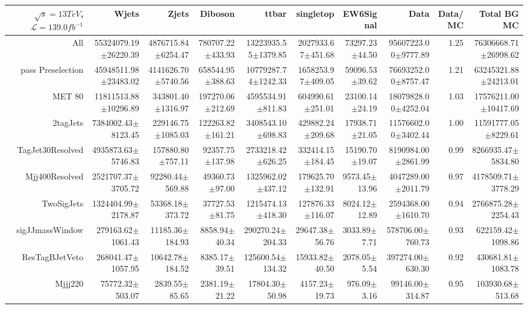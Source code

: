  \begin{tabular}{ r ||  r  r  r  r  r  r || r r r |} 
 \ensuremath{\sqrt{s}=13 TeV}, \ensuremath{\mathcal{L}=139.0 fb^{-1}}  & Wjets & Zjets & Diboson & ttbar & singletop & EW6Signal& Data & Data/MC & Total BG MC \tabularnewline 
 \hline 
All & 55324079.19$\pm$26220.39 & 4876715.84$\pm$6254.47 & 780707.22$\pm$433.93 & 13223935.55$\pm$1379.85 & 2027933.67$\pm$451.68 & 73297.23$\pm$44.50 & 95607223.00$\pm$9777.89 & 1.25 & 76306668.71$\pm$26998.62\tabularnewline \hline 
pass Preselection & 45948511.98$\pm$23483.02 & 4141626.70$\pm$5740.56 & 658544.95$\pm$388.63 & 10779287.74$\pm$1242.33 & 1658253.97$\pm$409.05 & 59096.53$\pm$39.62 & 76693252.00$\pm$8757.47 & 1.21 & 63245321.88$\pm$24213.01\tabularnewline \hline 
MET 80 & 11811513.88$\pm$10296.89 & 343801.40$\pm$1316.97 & 197270.06$\pm$212.69 & 4595534.91$\pm$811.83 & 604990.61$\pm$251.01 & 23100.14$\pm$24.19 & 18079828.00$\pm$4252.04 & 1.03 & 17576211.00$\pm$10417.69\tabularnewline \hline 
2tagJets & 7384002.43$\pm$8123.45 & 229146.75$\pm$1085.03 & 122263.82$\pm$161.21 & 3408543.10$\pm$698.83 & 429882.24$\pm$209.68 & 17938.71$\pm$21.05 & 11576602.00$\pm$3402.44 & 1.00 & 11591777.05$\pm$8229.61\tabularnewline \hline 
TagJet30Resolved & 4935873.63$\pm$5746.83 & 157880.80$\pm$757.11 & 92357.75$\pm$137.98 & 2733218.42$\pm$626.25 & 332414.15$\pm$184.45 & 15190.70$\pm$19.07 & 8190984.00$\pm$2861.99 & 0.99 & 8266935.47$\pm$5834.80\tabularnewline \hline 
Mjj400Resolved & 2521707.37$\pm$3705.72 & 92280.44$\pm$569.88 & 49360.73$\pm$97.00 & 1325962.02$\pm$437.12 & 179625.70$\pm$132.91 & 9573.45$\pm$13.96 & 4047289.00$\pm$2011.79 & 0.97 & 4178509.71$\pm$3778.29\tabularnewline \hline 
TwoSigJets & 1324404.99$\pm$2178.87 & 53368.18$\pm$373.72 & 37727.53$\pm$81.75 & 1215474.13$\pm$418.30 & 127876.33$\pm$116.07 & 8024.12$\pm$12.89 & 2594368.00$\pm$1610.70 & 0.94 & 2766875.28$\pm$2254.43\tabularnewline \hline 
sigJJmassWindow & 279163.62$\pm$1061.43 & 11185.36$\pm$184.93 & 8858.94$\pm$40.34 & 290270.24$\pm$204.33 & 29647.38$\pm$56.76 & 3033.89$\pm$7.71 & 578706.00$\pm$760.73 & 0.93 & 622159.42$\pm$1098.86\tabularnewline \hline 
ResTagBJetVeto & 268041.47$\pm$1057.95 & 10642.78$\pm$184.52 & 8385.17$\pm$39.51 & 125600.54$\pm$134.32 & 15933.82$\pm$40.50 & 2078.05$\pm$5.54 & 397274.00$\pm$630.30 & 0.92 & 430681.81$\pm$1083.78\tabularnewline \hline 
Mjjj220 & 75772.32$\pm$503.07 & 2839.55$\pm$85.65 & 2381.19$\pm$21.22 & 17804.30$\pm$50.98 & 4157.23$\pm$19.73 & 976.09$\pm$3.16 & 99146.00$\pm$314.87 & 0.95 & 103930.68$\pm$513.68\tabularnewline \hline 
\end{tabular}
